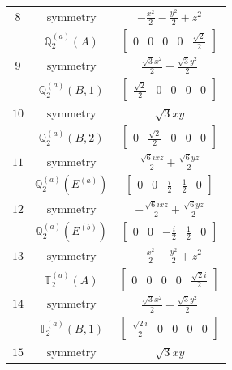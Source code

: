 \documentclass[fleqn,8pt,landscape]{jsarticle}
\begin{document}
\begin{longtable}{ccc}
$ 8 $ & $ \text{symmetry} $ & $ - \frac{x^{2}}{2} - \frac{y^{2}}{2} + z^{2} $ \\
$  $ & $ \mathbb{Q}_{2}^{(a)}(A) $ & $ \begin{bmatrix} 0 & 0 & 0 & 0 & \frac{\sqrt{2}}{2} \end{bmatrix} $ \\ \hline
$ 9 $ & $ \text{symmetry} $ & $ \frac{\sqrt{3} x^{2}}{2} - \frac{\sqrt{3} y^{2}}{2} $ \\
$  $ & $ \mathbb{Q}_{2}^{(a)}(B,1) $ & $ \begin{bmatrix} \frac{\sqrt{2}}{2} & 0 & 0 & 0 & 0 \end{bmatrix} $ \\ \hline
$ 10 $ & $ \text{symmetry} $ & $ \sqrt{3} x y $ \\
$  $ & $ \mathbb{Q}_{2}^{(a)}(B,2) $ & $ \begin{bmatrix} 0 & \frac{\sqrt{2}}{2} & 0 & 0 & 0 \end{bmatrix} $ \\ \hline
$ 11 $ & $ \text{symmetry} $ & $ \frac{\sqrt{6} i x z}{2} + \frac{\sqrt{6} y z}{2} $ \\
$  $ & $ \mathbb{Q}_{2}^{(a)}(E^{(a)}) $ & $ \begin{bmatrix} 0 & 0 & \frac{i}{2} & \frac{1}{2} & 0 \end{bmatrix} $ \\ \hline
$ 12 $ & $ \text{symmetry} $ & $ - \frac{\sqrt{6} i x z}{2} + \frac{\sqrt{6} y z}{2} $ \\
$  $ & $ \mathbb{Q}_{2}^{(a)}(E^{(b)}) $ & $ \begin{bmatrix} 0 & 0 & - \frac{i}{2} & \frac{1}{2} & 0 \end{bmatrix} $ \\ \hline
$ 13 $ & $ \text{symmetry} $ & $ - \frac{x^{2}}{2} - \frac{y^{2}}{2} + z^{2} $ \\
$  $ & $ \mathbb{T}_{2}^{(a)}(A) $ & $ \begin{bmatrix} 0 & 0 & 0 & 0 & \frac{\sqrt{2} i}{2} \end{bmatrix} $ \\ \hline
$ 14 $ & $ \text{symmetry} $ & $ \frac{\sqrt{3} x^{2}}{2} - \frac{\sqrt{3} y^{2}}{2} $ \\
$  $ & $ \mathbb{T}_{2}^{(a)}(B,1) $ & $ \begin{bmatrix} \frac{\sqrt{2} i}{2} & 0 & 0 & 0 & 0 \end{bmatrix} $ \\ \hline
$ 15 $ & $ \text{symmetry} $ & $ \sqrt{3} x y $ \\

\end{longtable}
\end{document}
